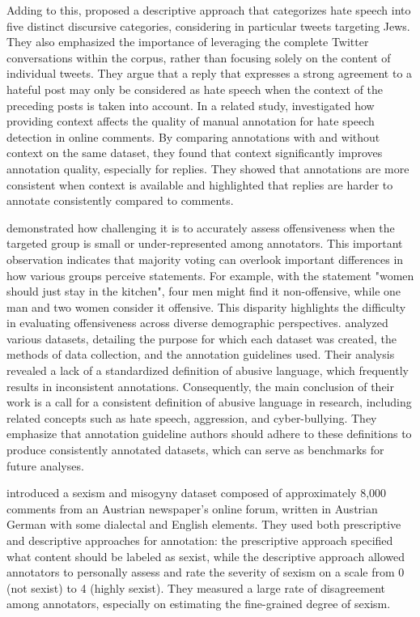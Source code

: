 Adding to this, \citet{Ron2023} proposed a descriptive approach that categorizes hate speech into five distinct discursive categories, considering in particular tweets targeting Jews. %
They also emphasized the importance of leveraging the complete Twitter conversations within the corpus, rather than focusing solely on the content of individual tweets. They argue that a reply that expresses a strong agreement to a hateful post may only be considered as hate speech when the context of the preceding posts is taken into account. 
%
In a related study, \citet{Ljubesic2023} investigated how providing context affects the quality of manual annotation for hate speech detection in online comments. By comparing annotations with and without context on the same dataset, they found that context significantly improves annotation quality, especially for replies. They showed that annotations are more consistent when context is available and highlighted that replies are harder to annotate consistently compared to comments.

\citet{Fleisig2023} demonstrated how challenging it is to accurately assess offensiveness when the targeted group is small or under-represented among annotators. This important observation indicates that majority voting can overlook important differences in how various groups perceive statements. For example, with the statement "women should just stay in the kitchen", four men might find it non-offensive, while one man and two women consider it offensive. This disparity highlights the difficulty in evaluating offensiveness across diverse demographic perspectives.
\citet{Seemann2023} analyzed various datasets, detailing the purpose for which each dataset was created, the methods of data collection, and the annotation guidelines used. Their analysis revealed a lack of a standardized definition of abusive language, which frequently results in inconsistent annotations. Consequently, the main conclusion of their work is a call for a consistent definition of abusive language in research, including related concepts such as hate speech, aggression, and cyber-bullying. They emphasize that annotation guideline authors should adhere to these definitions to produce consistently annotated datasets, which can serve as benchmarks for future analyses.

\citet{Krenn2024} introduced a sexism and misogyny dataset composed of approximately 8,000 comments from an Austrian newspaper's online forum, written in Austrian German with some dialectal and English elements. They used both prescriptive and descriptive approaches for annotation: the prescriptive approach specified what content should be labeled as sexist, while the descriptive approach allowed annotators to personally assess and rate the severity of sexism on a scale from 0 (not sexist) to 4 (highly sexist). They measured a large rate of disagreement among annotators, especially on estimating the fine-grained degree of sexism. %

